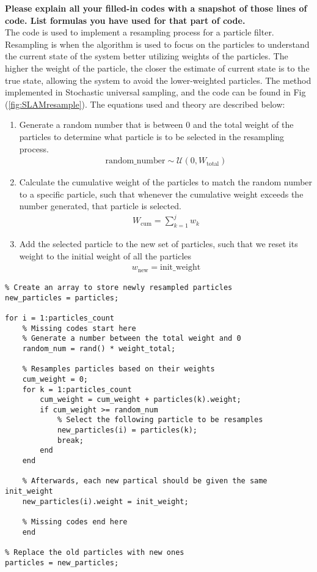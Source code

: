 \textbf{Please explain all your filled-in codes with a snapshot of those lines of code. List formulas you have used for that part of code.}\\
The code is used to implement a resampling process for a particle filter. Resampling is when the algorithm is used to focus on the particles to understand the current state of the system better utilizing weights of the particles. The higher the weight of the particle, the closer the estimate of current state is to the true state, allowing the system to avoid the lower-weighted particles. The method implemented in Stochastic universal sampling, and the code can be found in Fig (\ref{fig:SLAMresample}). The equations used and theory are described below:
\begin{enumerate}
    \item Generate a random number that is between 0 and the total weight of the particles to determine what particle is to be selected in the resampling process.
    \begin{align*}
        \text{random\_number} \sim \mathcal{U}(0, W_{\text{total}})
    \end{align*}
    \item Calculate the cumulative weight of the particles to match the random number to a specific particle, such that whenever the cumulative weight exceeds the number generated, that particle is selected.
    \begin{align}
        W_{\text{cum}} = \sum_{k=1}^{j} w_k
    \end{align}
    \item Add the selected particle to the new set of particles, such that we reset its weight to the initial weight of all the particles
    \begin{align*}
        w_{\text{new}} = \text{init\_weight}
    \end{align*}
\end{enumerate}

\begin{lstlisting}
% Create an array to store newly resampled particles
new_particles = particles;

for i = 1:particles_count
    % Missing codes start here
    % Generate a number between the total weight and 0
    random_num = rand() * weight_total;

    % Resamples particles based on their weights
    cum_weight = 0;
    for k = 1:particles_count
        cum_weight = cum_weight + particles(k).weight;
        if cum_weight >= random_num
            % Select the following particle to be resamples
            new_particles(i) = particles(k);
            break;
        end
    end

    % Afterwards, each new partical should be given the same init_weight
    new_particles(i).weight = init_weight;

    % Missing codes end here
    end

% Replace the old particles with new ones
particles = new_particles;
\end{lstlisting}
\label{fig:SLAMresample}
